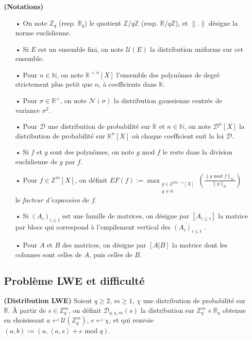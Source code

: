 \documentclass[11pt,a4paper]{article}
\begin{document}
\begin{defin}\textbf{(Notations)}
\begin{itemize}
\item[•] On note $\mathbb{Z}_q$ (resp. $\mathbb{R}_q$) le quotient $\mathbb{Z}/q\mathbb{Z}$ (resp. $\mathbb{R}/q\mathbb{Z}$), et $\|.\|$ désigne la norme euclidienne.
\item[•] Si $E$ est un ensemble fini, on note $\mathcal{U}(E)$ la distribution uniforme sur cet ensemble.
\item[•] Pour $n\in \mathbb{N}$, on note $\mathbb{K}^{<n}[X]$ l'ensemble des polynômes de degré strictement plus petit que $n$, à coefficients dans $\mathbb{K}$.
\item[•] Pour $\sigma \in \mathbb{R}^+$, on note $\mathcal{N}(\sigma)$ la distribution gaussienne centrée de variance $\sigma^2$.
\item[•] Pour $\mathcal{D}$ une distribution de probabilité sur $\mathbb{K}$ et $n\in \mathbb{N}$, on note $\mathcal{D}^n[X]$ la distribution de probabilité sur $\mathbb{K}^n[X]$ où chaque coefficient suit la loi $\mathcal{D}$.
\item[•] Si $f$ et $g$ sont des polynômes, on note $g \text{ mod } f$ le reste dans la division euclidienne de $g$ par $f$.
\item[•] Pour $f \in \mathbb{Z}^m[X]$, on définit $EF(f) :=\displaystyle \max_{\substack{g\in \mathbb{Z}^{2m-1}[X] \\ g \neq 0}}(\frac{\|g\text{ mod }f \|_\infty}{\|g\|_\infty})$ le \textit{facteur d'expansion} de $f$.
\item[•] Si $(A_i)_{i \leq t}$ est une famille de matrices, on désigne par $[A_{i\leq t}]$ la matrice par blocs qui correspond à l'empilement vertical des  $(A_i)_{i \leq t}$ .
\item[•] Pour $A$ et $B$ des matrices, on désigne par $[A|B]$ la matrice dont les colonnes sont celles de $A$, puis celles de $B$. 
\end{itemize}
\end{defin}

\subsection{Problème LWE et difficulté}

\begin{defin}\textbf{(Distribution LWE)}
Soient $q\geq 2$, $m\geq 1$, $\chi$ une distribution de probabilité sur $\mathbb{R}$. À partir de $s\in \mathbb{Z}_q^m$, on définit $\mathcal{D}_{q,\chi,m}(s)$ la distribution sur $\mathbb{Z}_q^m\times\mathbb{R}_q$ obtenue en choisissant $a \hookleftarrow \mathcal{U}(\mathbb{Z}_q^m)$, $e\hookleftarrow \chi$, et qui renvoie $(a,b):=(a,\left<a,s\right> +e \text{ mod } q)$.
\end{defin}
\end{document}

